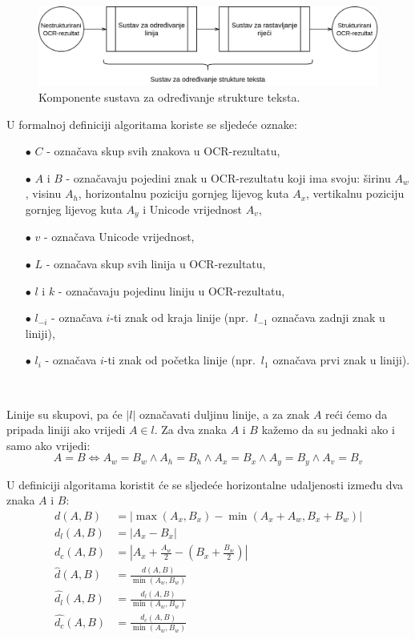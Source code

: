 \documentclass[times, utf8, zavrsni]{fer}
\begin{document}
\

\begin{figure}[htb]
    \centering
    \captionsetup{justification=centering,margin=2cm}
    \includegraphics[width=\textwidth]{images/sustav-03.png}
    \caption{
        Komponente sustava za određivanje strukture teksta.
    }
    \label{fig:sustav-03}
\end{figure}

U formalnoj definiciji algoritama koriste se sljedeće oznake:
\begin{itemize}
    \item[$\bullet$] $C$ - označava skup svih znakova u OCR-rezultatu,
    \item[$\bullet$] $A$ i $B$ - označavaju pojedini znak u OCR-rezultatu koji
    ima svoju: širinu $A_w$, visinu $A_h$, horizontalnu poziciju gornjeg
    lijevog kuta $A_x$, vertikalnu poziciju gornjeg lijevog kuta $A_y$ i
    Unicode vrijednost $A_v$,
    \item[$\bullet$] $v$ - označava Unicode vrijednost,
    \item[$\bullet$] $L$ - označava skup svih linija u OCR-rezultatu,
    \item[$\bullet$] $l$ i $k$ - označavaju pojedinu liniju u OCR-rezultatu,
    \item[$\bullet$] $l_{-i}$ - označava $i$-ti znak od kraja linije
    (npr.\ $l_{-1}$ označava zadnji znak u liniji),
    \item[$\bullet$] $l_i$ - označava $i$-ti znak od početka linije (npr.\
    $l_1$ označava prvi znak u liniji).
\end{itemize}

\

Linije su skupovi, pa će $|l|$ označavati duljinu linije,
a za znak $A$ reći ćemo da pripada liniji ako vrijedi $A \in l$.
Za dva znaka $A$ i $B$ kažemo da su jednaki ako i samo ako vrijedi:
\[
A = B \iff
A_w = B_w \land A_h = B_h \land A_x = B_x \land A_y = B_y \land A_v = B_v
\]

U definiciji algoritama koristit će se sljedeće horizontalne udaljenosti između
dva znaka $A$ i $B$:
\begin{align}
d(A, B) &= |\max(A_x, B_x) - \min(A_x + A_w, B_x + B_w)| \\
d_l(A, B) &= |A_x - B_x| \\
d_c(A, B) &= |A_x + \frac{A_w}{2} - (B_x + \frac{B_w}{2})| \\
\hat{d}(A, B) &= \frac{d(A, B)}{\min(A_w, B_w)} \\
\hat{d_l}(A, B) &= \frac{d_l(A, B)}{\min(A_w, B_w)} \\
\hat{d_c}(A, B) &= \frac{d_c(A, B)}{\min(A_w, B_w)}
\end{align}
\end{document}
